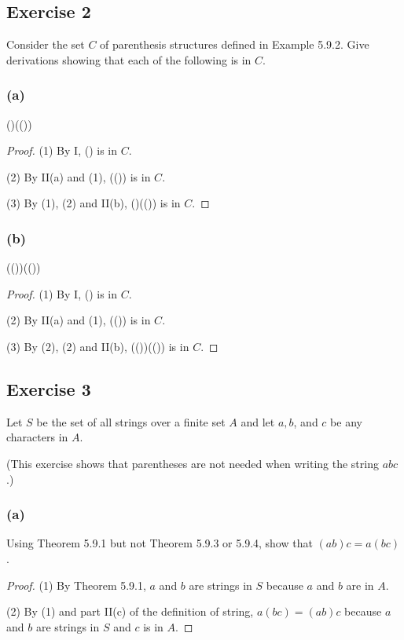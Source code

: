 \documentclass[14pt]{extarticle}
\begin{document}
\subsection{Exercise 2}
Consider the set $C$ of parenthesis structures defined in Example 5.9.2.
Give derivations showing that each of the following is in $C$.

\subsubsection{(a)}
()(())

\begin{proof}
    (1) By I, () is in $C$.

    (2) By II(a) and (1), (()) is in $C$.

    (3) By (1), (2) and II(b), ()(()) is in $C$.
\end{proof}

\subsubsection{(b)}
(())(())

\begin{proof}
    (1) By I, () is in $C$.

    (2) By II(a) and (1), (()) is in $C$.

    (3) By (2), (2) and II(b), (())(()) is in $C$.
\end{proof}

\subsection{Exercise 3}
Let $S$ be the set of all strings over a finite set $A$ and let $a, b$, and $c$ be any characters in $A$.

(This exercise shows that parentheses are not needed when writing the string $abc$.)

\subsubsection{(a)}
Using Theorem 5.9.1 but not Theorem 5.9.3 or 5.9.4, show that \((ab)c = a(bc)\).

\begin{proof}
    (1) By Theorem 5.9.1, $a$ and $b$ are strings in $S$ because $a$ and $b$ are in $A$.

    (2) By (1) and part II(c) of the definition of string, $a(bc) = (ab)c$ because $a$ and $b$ are strings in $S$ and
    $c$ is in $A$.
\end{proof}
\end{document}

